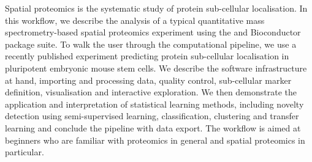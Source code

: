 Spatial proteomics is the systematic study of protein sub-cellular
localisation. In this workflow, we describe the analysis of a typical
quantitative mass spectrometry-based spatial proteomics experiment
using the  and  Bioconductor package
suite. To walk the user through the computational pipeline, we use a
recently published experiment predicting protein sub-cellular
localisation in pluripotent embryonic mouse stem cells. We describe
the software infrastructure at hand, importing and processing data,
quality control, sub-cellular marker definition, visualisation and
interactive exploration. We then demonstrate the application and
interpretation of statistical learning methods, including novelty
detection using semi-supervised learning, classification, clustering
and transfer learning and conclude the pipeline with data export. The
workflow is aimed at beginners who are familiar with proteomics in
general and spatial proteomics in particular.
